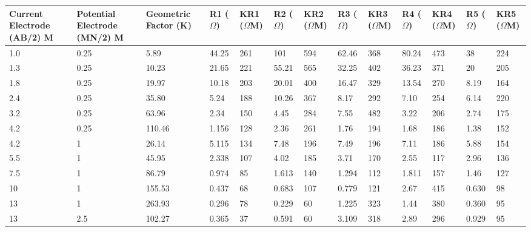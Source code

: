 \documentclass[12pt,a4paper]{report}
\begin{document}
\begin{itemize}
    \begin{table}[H]
        \centering
        \begin{adjustbox}{max width=\textwidth}
        \renewcommand{\arraystretch}{1.5}
        \begin{tabular}{|p{2.5cm}|p{2.5cm}|p{2.5cm}|p{1.5cm}|p{1.8cm}|p{1.5cm}|p{1.8cm}|p{1.5cm}|p{1.8cm}|p{1.5cm}|p{1.8cm}|p{1.5cm}|p{1.8cm}|}
        \hline
        \textbf{Current Electrode (AB/2) M} & 
        \textbf{Potential Electrode (MN/2) M} & 
        \textbf{Geometric Factor (K)} & 
        \textbf{R1 ($\Omega$)} & 
        \textbf{KR1 ($\Omega$M)} & 
        \textbf{R2 ($\Omega$)} & 
        \textbf{KR2 ($\Omega$M)} & 
        \textbf{R3 ($\Omega$)} & 
        \textbf{KR3 ($\Omega$M)} & 
        \textbf{R4 ($\Omega$)} & 
        \textbf{KR4 ($\Omega$M)} & 
        \textbf{R5 ($\Omega$)} & 
        \textbf{KR5 ($\Omega$M)} \\ 
        \hline
        1.0 & 0.25 & 5.89 & 44.25 & 261 & 101 & 594 & 62.46 & 368 & 80.24 & 473 & 38 & 224 \\ \hline
        1.3 & 0.25 & 10.23 & 21.65 & 221 & 55.21 & 565 & 32.25 & 402 & 36.23 & 371 & 20 & 205 \\ \hline
        1.8 & 0.25 & 19.97 & 10.18 & 203 & 20.01 & 400 & 16.47 & 329 & 13.54 & 270 & 8.19 & 164 \\ \hline
        2.4 & 0.25 & 35.80 & 5.24 & 188 & 10.26 & 367 & 8.17 & 292 & 7.10 & 254 & 6.14 & 220 \\ \hline
        3.2 & 0.25 & 63.96 & 2.34 & 150 & 4.45 & 284 & 7.55 & 482 & 3.22 & 206 & 2.74 & 175 \\ \hline
        4.2 & 0.25 & 110.46 & 1.156 & 128 & 2.36 & 261 & 1.76 & 194 & 1.68 & 186 & 1.38 & 152 \\ \hline
        4.2 & 1 & 26.14 & 5.115 & 134 & 7.48 & 196 & 7.49 & 196 & 7.11 & 186 & 5.88 & 154 \\ \hline
        5.5 & 1 & 45.95 & 2.338 & 107 & 4.02 & 185 & 3.71 & 170 & 2.55 & 117 & 2.96 & 136 \\ \hline
        7.5 & 1 & 86.79 & 0.974 & 85 & 1.613 & 140 & 1.294 & 112 & 1.811 & 157 & 1.46 & 127 \\ \hline
        10 & 1 & 155.53 & 0.437 & 68 & 0.683 & 107 & 0.779 & 121 & 2.67 & 415 & 0.630 & 98 \\ \hline
        13 & 1 & 263.93 & 0.296 & 78 & 0.229 & 60 & 1.225 & 323 & 1.44 & 380 & 0.360 & 95 \\ \hline
        13 & 2.5 & 102.27 & 0.365 & 37 & 0.591 & 60 & 3.109 & 318 & 2.89 & 296 & 0.929 & 95 \\ \hline

\end{tabular}
\end{adjustbox}
\end{table}
\end{itemize}
\end{document}
